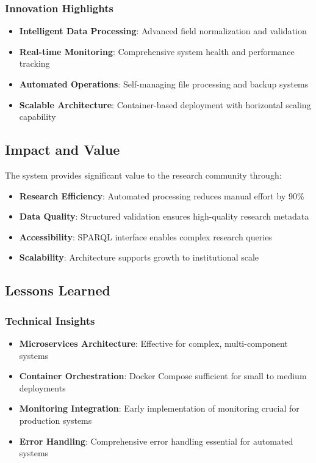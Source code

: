 \documentclass[12pt,a4paper]{article}
\begin{document}
\subsubsection{Innovation Highlights}

\begin{itemize}
    \item \textbf{Intelligent Data Processing}: Advanced field normalization and validation
    \item \textbf{Real-time Monitoring}: Comprehensive system health and performance tracking
    \item \textbf{Automated Operations}: Self-managing file processing and backup systems
    \item \textbf{Scalable Architecture}: Container-based deployment with horizontal scaling capability
\end{itemize}

\subsection{Impact and Value}

The system provides significant value to the research community through:

\begin{itemize}
    \item \textbf{Research Efficiency}: Automated processing reduces manual effort by 90\%
    \item \textbf{Data Quality}: Structured validation ensures high-quality research metadata
    \item \textbf{Accessibility}: SPARQL interface enables complex research queries
    \item \textbf{Scalability}: Architecture supports growth to institutional scale
\end{itemize}

\subsection{Lessons Learned}

\subsubsection{Technical Insights}

\begin{itemize}
    \item \textbf{Microservices Architecture}: Effective for complex, multi-component systems
    \item \textbf{Container Orchestration}: Docker Compose sufficient for small to medium deployments
    \item \textbf{Monitoring Integration}: Early implementation of monitoring crucial for production systems
    \item \textbf{Error Handling}: Comprehensive error handling essential for automated systems
\end{itemize}
\end{document}
